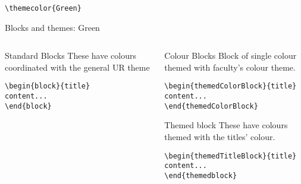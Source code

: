 \begingroup
{}
\begin{center}\verb|\themecolor{Green}|\end{center}
\begin{frame}[fragile]{Blocks and themes: Green}
\begin{columns} %
\begin{column}{0.3\textwidth}
\begin{block}{Standard Blocks}
These have colours coordinated with the general UR theme
\begin{verbatim}
\begin{block}{title}
content...
\end{block}
\end{verbatim}
\end{block}
\end{column}
\begin{column}{0.7\textwidth}
\begin{themedColorBlock}{Colour Blocks}
Block of single colour themed with faculty's colour theme.
\small
\begin{verbatim}
\begin{themedColorBlock}{title}
content...
\end{themedColorBlock}
\end{verbatim}
\end{themedColorBlock}
\begin{themedTitleBlock} {Themed block}
These have colours themed with the titles' colour.
\small
\begin{verbatim}
\begin{themedTitleBlock}{title}
content...
\end{themedblock}
\end{verbatim}
\end{themedTitleBlock}
\end{column}
\end{columns}
\end{frame}
\endgroup


